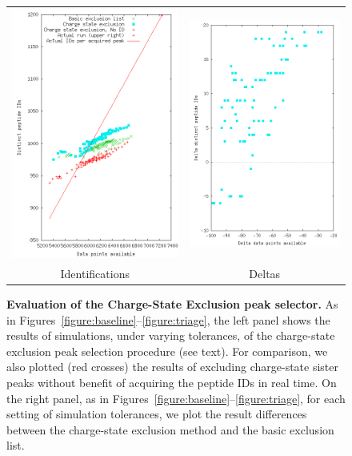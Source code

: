 \documentclass[12pt,twoside,openright]{report}
\begin{document}
\begin{figure}
\centering
\begin{tabular}{cc}
\includegraphics[width=3.0in]{4_chargestates2.png} &
\includegraphics[width=3.0in]{4b_chargestates2.png} \\
Identifications & Deltas \\
\end{tabular}
\caption[Evaluation of the Charge-State Exclusion peak selector]{{\bf Evaluation
    of the Charge-State Exclusion peak selector.} As in
  Figures~\ref{figure:baseline}--\ref{figure:triage}, the left panel shows the
  results of simulations, under varying tolerances, of the charge-state
  exclusion peak selection procedure (see text).  For comparison, we also
  plotted (red crosses) the results of excluding charge-state sister peaks
  without benefit of acquiring the peptide IDs in real time.  On the right
  panel, as in Figures~\ref{figure:baseline}--\ref{figure:triage}, for each
  setting of simulation tolerances, we plot the result differences between the
  charge-state exclusion method and the basic exclusion list.
  \label{figure:chargestate}}
\end{figure}
\end{document}
